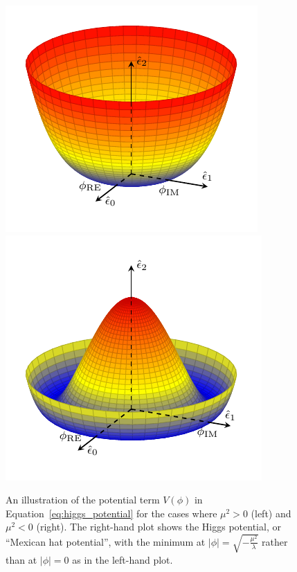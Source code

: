 \begin{figure}[htbp]
  \centering
  \includegraphics[width=.48\textwidth]{figs/theory/higgspotential_greater0}
  \includegraphics[width=.48\textwidth]{figs/theory/higgspotential}
  \caption{An illustration of the potential term $V(\phi)$ in Equation~\ref{eq:higgs_potential} for the cases where $\mu^2>0$ (left) and $\mu^2<0$ (right).  The right-hand plot shows the Higgs potential, or ``Mexican hat potential'', with the minimum at $|\phi| = \sqrt{-\frac{\mu^2}{\lambda}}$ rather than at $|\phi| = 0$ as in the left-hand plot.}
  \label{fig:mexican_hat}
\end{figure}

